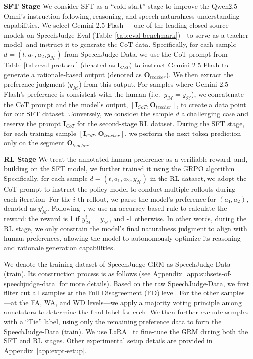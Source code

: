 \documentclass[]{bytedance_seed}
\begin{document}
\textbf{SFT Stage}\quad
We consider SFT as a ``cold start'' stage to improve the Qwen2.5-Omni's instruction-following, reasoning, and speech naturalness understanding capabilities. We select Gemini-2.5-Flash~\citep{gemini2.5}—one of the leading closed-source models on SpeechJudge-Eval (Table~\ref{tab:eval-benchmark})—to serve as a teacher model, and instruct it to generate the CoT data. Specifically, for each sample $d = (t, a_1,  a_2, y_{\mathcal{H}})$ from SpeechJudge-Data, we use the CoT prompt from Table~\ref{tab:eval-protocol} (denoted as $\mathbf{I}_{CoT}$) to instruct Gemini-2.5-Flash to generate a rationale-based output (denoted as $\mathbf{O}_{teacher}$). We then extract the preference judgment ($y_{\mathcal{M}}$) from this output. For samples where Gemini-2.5-Flash's preference is consistent with the human (i.e., $y_{\mathcal{M}} = y_{\mathcal{H}}$), we concatenate the CoT prompt and the model's output, $[\mathbf{I}_{CoT},\mathbf{O}_{teacher}]$, to create a data point for our SFT dataset. Conversely, we consider the sample $d$ a challenging case and reserve the prompt $\mathbf{I}_{CoT}$ for the second-stage RL dataset. During the SFT stage, for each training sample $[\mathbf{I}_{CoT},\mathbf{O}_{teacher}]$, we perform the next token prediction only on the segment $\mathbf{O}_{teacher}$.

\textbf{RL Stage}\quad
We treat the annotated human preference as a verifiable reward, and, building on the SFT model, we further trained it using the GRPO algorithm~\citep{grpo}. Specifically, for each sample $d = (t, a_1, a_2, y_{\mathcal{H}})$ in the RL dataset, we adopt the CoT prompt to instruct the policy model to conduct multiple rollouts during each iteration. For the $i$-th rollout, we parse the model's preference for $(a_1,  a_2)$, denoted as $y_{\mathcal{M}}^{i}$. Following~\citep{deepseek-grm}, we use an accuracy-based rule to calculate the reward: the reward is 1 if $y_{\mathcal{M}}^{i} = y_{\mathcal{H}}$, and -1 otherwise. In other words, during the RL stage, we only constrain the model's final naturalness judgment to align with human preferences, allowing the model to autonomously optimize its reasoning and rationale generation capabilities.

We denote the training dataset of SpeechJudge-GRM as SpeechJudge-Data (train). Its construction process is as follows (see Appendix~\ref{app:subsets-of-speechjudge-data} for more details). Based on the raw SpeechJudge-Data, we first filter out all samples at the Full Disagreement (FD) level. For the other samples—at the FA, WA, and WD levels—we apply a majority voting principle among annotators to determine the final label for each. We then further exclude samples with a ``Tie'' label, using only the remaining preference data to form the SpeechJudge-Data (train).
We use LoRA~\citep{lora} to fine-tune the GRM during both the SFT and RL stages. Other experimental setup details are provided in Appendix~\ref{app:expt-setup}.
\end{document}

